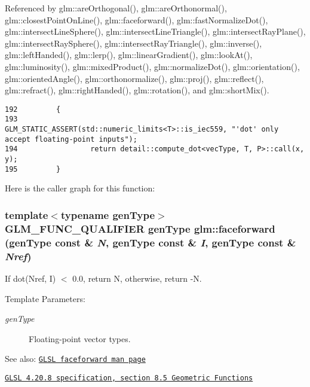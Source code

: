 Referenced by glm::areOrthogonal(), glm::areOrthonormal(), glm::closestPointOnLine(), glm::faceforward(), glm::fastNormalizeDot(), glm::intersectLineSphere(), glm::intersectLineTriangle(), glm::intersectRayPlane(), glm::intersectRaySphere(), glm::intersectRayTriangle(), glm::inverse(), glm::leftHanded(), glm::lerp(), glm::linearGradient(), glm::lookAt(), glm::luminosity(), glm::mixedProduct(), glm::normalizeDot(), glm::orientation(), glm::orientedAngle(), glm::orthonormalize(), glm::proj(), glm::reflect(), glm::refract(), glm::rightHanded(), glm::rotation(), and glm::shortMix().

\begin{Code}\begin{verbatim}192         {
193                 GLM_STATIC_ASSERT(std::numeric_limits<T>::is_iec559, "'dot' only accept floating-point inputs");
194                 return detail::compute_dot<vecType, T, P>::call(x, y);
195         }
\end{verbatim}
\end{Code}




Here is the caller graph for this function:\hypertarget{group__core__func__geometric_ga4cdf87f6fd660e7086776d9abb6cbae}{
\subsubsection[faceforward]{\setlength{\rightskip}{0pt plus 5cm}template$<$typename genType$>$ GLM\_\-FUNC\_\-QUALIFIER genType glm::faceforward (genType const \& {\em N}, \/  genType const \& {\em I}, \/  genType const \& {\em Nref})}}
\label{group__core__func__geometric_ga4cdf87f6fd660e7086776d9abb6cbae}


If dot(Nref, I) $<$ 0.0, return N, otherwise, return -N.

\begin{Desc}
\item[Template Parameters:]
\begin{description}
\item[{\em genType}]Floating-point vector types.\end{description}
\end{Desc}
\begin{Desc}
\item[See also:]\href{http://www.opengl.org/sdk/docs/manglsl/xhtml/faceforward.xml}{\tt GLSL faceforward man page} 

\href{http://www.opengl.org/registry/doc/GLSLangSpec.4.20.8.pdf}{\tt GLSL 4.20.8 specification, section 8.5 Geometric Functions} \end{Desc}


